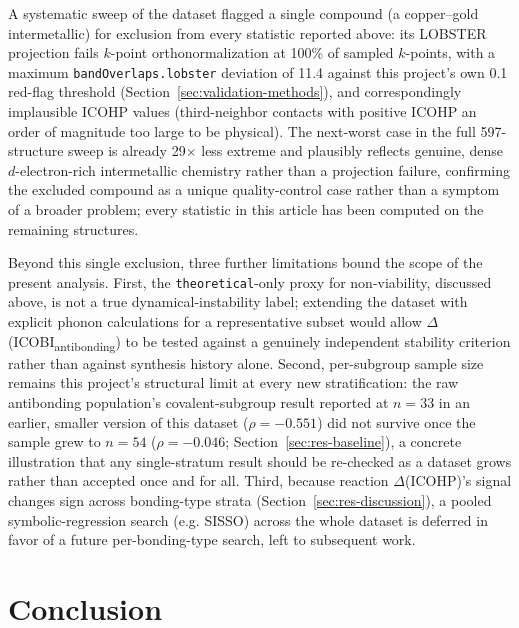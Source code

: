 \documentclass[journal=jpccck,manuscript=article]{achemso}
\begin{document}
A systematic sweep of the dataset flagged a single compound (a
copper--gold intermetallic) for exclusion from every statistic reported
above: its LOBSTER projection fails $k$-point orthonormalization at 100\% of
sampled $k$-points, with a maximum \texttt{bandOverlaps.lobster} deviation of
11.4 against this project's own 0.1 red-flag threshold (Section~\ref{sec:validation-methods}),
and correspondingly implausible ICOHP values (third-neighbor contacts with
positive ICOHP an order of magnitude too large to be physical). The
next-worst case in the full 597-structure sweep is already
29$\times$ less extreme and plausibly reflects genuine, dense
$d$-electron-rich intermetallic chemistry rather than a projection failure,
confirming the excluded compound as a unique quality-control case rather
than a symptom of a broader problem; every statistic in this article has
been computed on the remaining structures.

Beyond this single exclusion, three further limitations bound the scope of
the present analysis. First, the \texttt{theoretical}-only proxy for
non-viability, discussed above, is not a true dynamical-instability label;
extending the dataset with explicit phonon calculations for a representative
subset would allow $\Delta$(ICOBI\textsubscript{antibonding}) to be tested
against a genuinely independent stability criterion rather than against
synthesis history alone. Second, per-subgroup sample size remains this
project's structural limit at every new stratification: the raw antibonding
population's covalent-subgroup result reported at $n=33$ in an earlier,
smaller version of this dataset ($\rho=-0.551$) did not survive once the
sample grew to $n=54$ ($\rho=-0.046$; Section~\ref{sec:res-baseline}), a
concrete illustration that any single-stratum result should be re-checked as
a dataset grows rather than accepted once and for all. Third, because
reaction $\Delta$(ICOHP)'s signal changes sign across bonding-type strata
(Section~\ref{sec:res-discussion}), a pooled symbolic-regression search
(e.g. SISSO) across the whole dataset is deferred in favor of a future
per-bonding-type search, left to subsequent work.

\section{Conclusion}
\label{sec:conclusion}
\end{document}
